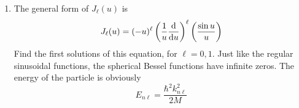 \documentclass[../psets.tex]{subfiles}
\begin{document}
\begin{enumerate}
\begin{enumerate}
\begin{proof}
            \begin{align*}
                0 &= \dv{r}(r^2\dv{r}[R_{n\ell}(r)])-\frac{2Mr^2}{\hbar^2}[0-E_{n\ell}]R_{n\ell}(r)-\ell(\ell+1)R_{n\ell}(r)\\
                &= r^2\dv[2]{r}[R_{n\ell}(r)]+2r\dv{r}[R_{n\ell}(r)]+k_{n\ell}^2r^2R_{n\ell}(r)-\ell(\ell+1)R_{n\ell}(r)
            \end{align*}
            Now define $u:=k_{n\ell}r$ as suggested in the problem statement and initiate a change of variables in the above differential equation.
            \begin{align*}
                \begin{split}
                    0 ={}& \left( \frac{u}{k_{n\ell}} \right)^2\dv{r}(\dv{u}[R_{n\ell}(u(r))]\cdot\dv{u}{r})+\frac{2u}{k_{n\ell}}\dv{u}[R_{n\ell}(u(r))]\cdot\dv{u}{r}\\
                    & +k_{n\ell}^2\left( \frac{u}{k_{n\ell}} \right)^2R_{n\ell}(u(r))-\ell(\ell+1)R_{n\ell}(u(r))
                \end{split}\\
                ={}& \frac{u^2}{k_{n\ell}^2}\dv{u}(\dv{u}[R_{n\ell}(u)]\cdot k_{n\ell})\cdot\dv{u}{r}+\frac{2u}{k_{n\ell}}\dv{u}[R_{n\ell}(u)]\cdot k_{n\ell}+u^2R_{n\ell}(u)-\ell(\ell+1)R_{n\ell}(u)\\
                ={}& u^2\dv[2]{u}[R_{n\ell}(u)]+2u\dv{u}[R_{n\ell}(u)]+[u^2-\ell(\ell+1)]R_{n\ell}(u)
            \end{align*}
            This leads us to derive the spherical Bessel equation exactly. Thus, the solutions for $\ell\neq 0$ are
            \begin{align*}
                R_{n\ell}(u) &= J_\ell(u)\\
                \Aboxed{R_{n\ell}(r) &= J_\ell(k_{n\ell}r)}
            \end{align*}
        \end{proof}
        \item The general form of $J_\ell(u)$ is
        \begin{equation}
            J_\ell(u) = (-u)^\ell\left( \frac{1}{u}\dv{u} \right)^\ell\left( \frac{\sin u}{u} \right)
        \end{equation}
        Find the first solutions of this equation, for $\ell=0,1$. Just like the regular sinusoidal functions, the spherical Bessel functions have infinite zeros. The energy of the particle is obviously
        \begin{equation}
            E_{n\ell} = \frac{\hbar^2k_{n\ell}^2}{2M}

\end{equation}
\end{enumerate}
\end{enumerate}
\end{document}
